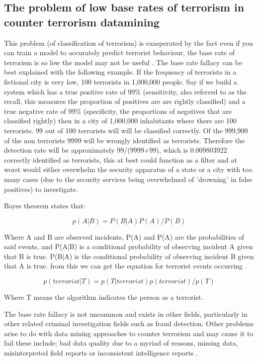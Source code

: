\subsection{The problem of low base rates of terrorism in counter terrorism datamining}

This problem (of classification of terrorism) is exasperated by the fact even if you can train a model to accurately predict terrorist behaviour, the base rate of terrorism is so low the model may not be useful \citep{jensen2003information}. The base rate fallacy can be best explained with the following example. If the frequency of terrorists in a fictional city is very low, 100 terrorists in 1,000,000 people. Say if we build a system which has a true positive rate of 99\% (sensitivity, also referred to as the recall, this measures the proportion of positives are are rightly classified) and a true negative rate of 99\% (specificity, the proportions of negatives that are classified rightly) then in a city of 1,000,000 inhabitants where there are 100 terrorists. 99 out of 100 terrorists will will be classified correctly. Of the 999,900 of the non terrorists 9999 will be wrongly identified as terrorists. Therefore the detection rate will be approximately 99/(9999+99), which is  0.009803922 correctly identified as terrorists, this at best could function as a filter and at worst would either overwhelm the security apparatus of a state or a city with too many cases (due to the security services being overwhelmed of 'drowning' in false positives) to investigate. 

Bayes theorem states that:

\begin{equation} p(A|B)=P(B|A)P(A)/P(B) \label{eq1bayes}  \end{equation}

Where A and B are observed incidents, P(A) and P(A) are the probabilities of said events, and P(A$\vert$B) is a conditional probability of observing incident A given that B is true. P(B$\vert$A) is the conditional probability of observing incident B given that A is true. from this we can get the equation for terrorist events occurring  \label{eq2bayes}.
 
\begin{equation} p(terrorist|T)=p(T|terrorist)p(terrorist)/p(T) \label{eq2bayes}  \end{equation}

Where T means the algorithm indicates the person as a terrorist.

The base rate fallacy is not uncommon and exists in other fields, particularly in other related criminal investigation fields such as fraud detection. Other problems arise to do with data mining approaches to counter terrorism and may cause it to fail these include; bad data quality due to a myriad of reasons, missing data, misinterpreted field reports or inconsistent intelligence reports \citep{thuraisingham2004data}. 


